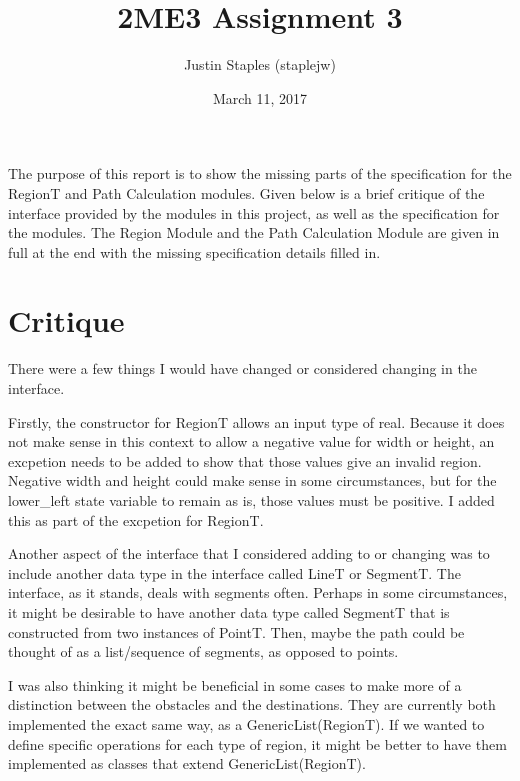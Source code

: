 \documentclass[12pt]{article}
\title{2ME3 Assignment 3}
\author{Justin Staples (staplejw)}
\date{March 11, 2017}
\begin{document}
\maketitle
\thispagestyle{empty}

\newpage

\setcounter{page}{1}

The purpose of this report is to show the missing parts of the specification for the RegionT and Path Calculation modules. Given below is a brief critique of the interface provided by the modules in this project, as well as the specification for the modules. The Region Module and the Path Calculation Module are given in full at the end with the missing specification details filled in. 

\section* {Critique}

There were a few things I would have changed or considered changing in the interface. 

Firstly, the constructor for RegionT allows an input type of real. Because it does not make sense in this context to allow a negative value for width or height, an excpetion needs to be added to show that  those values give an invalid region. Negative width and height could make sense in some circumstances, but for the lower\_left state variable to remain as is, those values must be positive. I added this as part of the excpetion for RegionT. 

Another aspect of the interface that I considered adding to or changing was to include another data type in the interface called LineT or SegmentT. The interface, as it stands, deals with segments often. Perhaps in some circumstances, it might be desirable to have another data type called SegmentT that is constructed from two instances of PointT. Then, maybe the path could be thought of as a list/sequence of segments, as opposed to points. 

I was also thinking it might be beneficial in some cases to make more of a distinction between the obstacles and the destinations. They are currently both implemented the exact same way, as a GenericList(RegionT). If we wanted to define specific operations for each type of region, it might be better to have them implemented as classes that extend GenericList(RegionT). 
\end{document}
